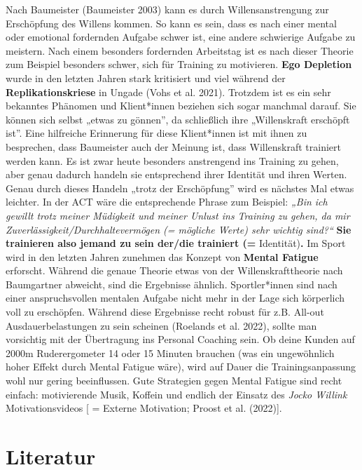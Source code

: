 \documentclass[
  letterpaper,
  DIV=11,
  numbers=noendperiod]{scrreprt}
\begin{document}
Nach Baumeister (Baumeister 2003) kann es durch Willensanstrengung zur
Erschöpfung des Willens kommen. So kann es sein, dass es nach einer
mental oder emotional fordernden Aufgabe schwer ist, eine andere
schwierige Aufgabe zu meistern. Nach einem besonders fordernden
Arbeitstag ist es nach dieser Theorie zum Beispiel besonders schwer,
sich für Training zu motivieren. \textbf{Ego Depletion} wurde in den
letzten Jahren stark kritisiert und viel während der
\textbf{Replikationskriese} in Ungade (Vohs et al. 2021). Trotzdem ist
es ein sehr bekanntes Phänomen und Klient*innen beziehen sich sogar
manchmal darauf. Sie können sich selbst „etwas zu gönnen'', da
schließlich ihre „Willenskraft erschöpft ist''. Eine hilfreiche
Erinnerung für diese Klient*innen ist mit ihnen zu besprechen, dass
Baumeister auch der Meinung ist, dass Willenskraft trainiert werden
kann. Es ist zwar heute besonders anstrengend ins Training zu gehen,
aber genau dadurch handeln sie entsprechend ihrer Identität und ihren
Werten. Genau durch dieses Handeln „trotz der Erschöpfung'' wird es
nächstes Mal etwas leichter. In der ACT wäre die entsprechende Phrase
zum Beispiel: \emph{„Bin ich gewillt trotz meiner Müdigkeit und meiner
Unlust ins Training zu gehen, da mir Zuverlässigkeit/Durchhaltevermögen
(= mögliche Werte) sehr wichtig sind?{}``} \textbf{Sie trainieren also
jemand zu sein der/die trainiert (=} Identität)\textbf{.} Im Sport wird
in den letzten Jahren zunehmen das Konzept von \textbf{Mental Fatigue}
erforscht. Während die genaue Theorie etwas von der Willenskrafttheorie
nach Baumgartner abweicht, sind die Ergebnisse ähnlich. Sportler*innen
sind nach einer anspruchsvollen mentalen Aufgabe nicht mehr in der Lage
sich körperlich voll zu erschöpfen. Während diese Ergebnisse recht
robust für z.B. All-out Ausdauerbelastungen zu sein scheinen (Roelands
et al. 2022), sollte man vorsichtig mit der Übertragung ins Personal
Coaching sein. Ob deine Kunden auf 2000m Ruderergometer 14 oder 15
Minuten brauchen (was ein ungewöhnlich hoher Effekt durch Mental Fatigue
wäre), wird auf Dauer die Trainingsanpassung wohl nur gering
beeinflussen. Gute Strategien gegen Mental Fatigue sind recht einfach:
motivierende Musik, Koffein und endlich der Einsatz des \emph{Jocko
Willink} Motivationsvideos {[} = Externe Motivation; Proost et al.
(2022){]}.

\section{Literatur}\label{literatur-5}
\end{document}
